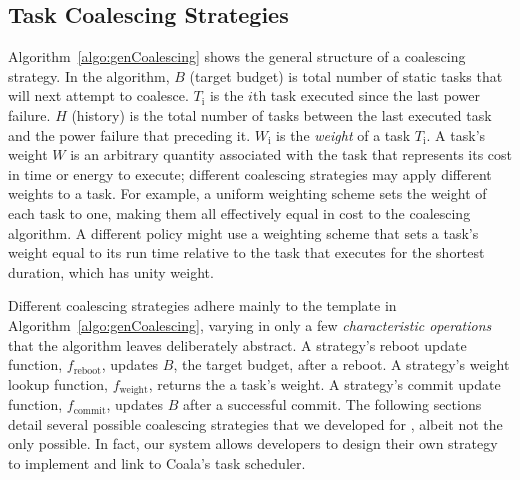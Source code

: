 \subsection{Task Coalescing Strategies} 
Algorithm~\ref{algo:genCoalescing} shows the general structure of a coalescing strategy. In the algorithm, $B$ (target budget) is total number of static tasks
that \sys will next attempt to coalesce. $T_\text{i}$ is the $i$th task
executed since the last power failure. $H$ (history) is the total number of
tasks between the last executed task and the power failure that preceding it.
$W_\text{i}$ is the {\em weight} of a task $T_\text{i}$.  A task's weight $W$ is an
arbitrary quantity associated with the task that represents its cost in time or
energy to execute; different coalescing strategies may apply different weights
to a task.  For example, a uniform weighting scheme sets the weight of each
task to one, making them all effectively equal in cost to the coalescing
algorithm.  A different policy might use a weighting scheme that sets a task's
weight equal to its run time relative to the task that executes for the
shortest duration, which has unity weight. 

Different coalescing strategies adhere mainly to the template in
Algorithm~\ref{algo:genCoalescing}, varying in only a few {\em characteristic
operations} that the algorithm leaves deliberately abstract.  A strategy's
reboot update function, $f_\text{reboot}$, updates $B$, the target budget,
after a reboot. A strategy's weight lookup function, $f_\text{weight}$, returns
the a task's weight.  A strategy's commit update function, $f_\text{commit}$,
updates $B$ after a successful commit. The following sections detail several
possible coalescing strategies that we developed for \sys, albeit not the only possible. In fact, our system allows developers to design their own strategy to implement and link to Coala’s task scheduler. 
% 
